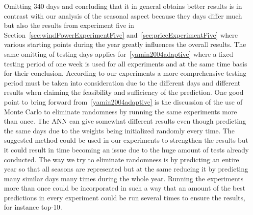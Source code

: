 Omitting 340 days and concluding that it in general obtains better results is in contrast with our analysis of the seasonal aspect because they days differ much but also the results from experiment five in Section~\ref{sec:windPowerExperimentFive} and~\ref{sec:priceExperimentFive} where various starting points during the year greatly influences the overall results. The same omitting of testing days applies for~\ref{yamin2004adaptive} where a fixed testing period of one week is used for all experiments and at the same time basis for their conclusion. According to our experiments a more comprehensive testing period must be taken into consideration due to the different days and different results when claiming the feasibility and sufficiency of the prediction. One good point to bring forward from~\ref{yamin2004adaptive} is the discussion of the use of Monte Carlo to eliminate randomness by running the same experiments more than once. The ANN can give somewhat different results even though predicting the same days due to the weights being initialized randomly every time. The suggested method could be used in our experiments to strengthen the results but it could result in time becoming an issue due to the huge amount of tests already conducted. The way we try to eliminate randomness is by predicting an entire year so that all seasons are represented but at the same reducing it by predicting many similar days many times during the whole year. Running the experiments more than once could be incorporated in such a way that an amount of the best predictions in every experiment could be run several times to ensure the results, for instance top-10. 